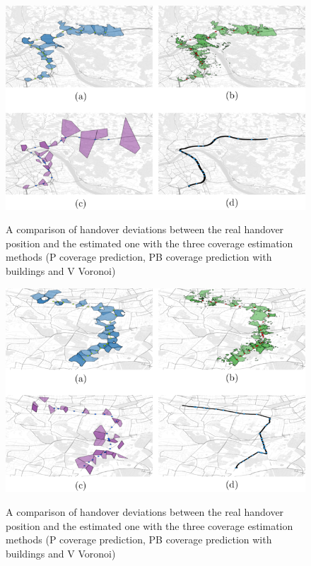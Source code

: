 \documentclass[twocolumn]{bmcart}%
\begin{document}
\begin{backmatter}
\begin{figure}[h!]
		\caption{ A comparison of handover deviations between the real handover position and the estimated one with the three coverage estimation methods (P coverage prediction, PB coverage prediction with buildings and V Voronoi)
		}
		\includegraphics[height=0.40\textheight]{images/563standalone.png}
				\label{fig:563}
	\end{figure}
	
	
	
	\begin{figure}[h!]

		\caption{ A comparison of handover deviations between the real handover position and the estimated one with the three coverage estimation methods (P coverage prediction, PB coverage prediction with buildings and V Voronoi)
		}
		\includegraphics[height=0.40\textheight]{images/144standalone.png}
				\label{fig:144}
	\end{figure}
	

\end{backmatter}
\end{document}
